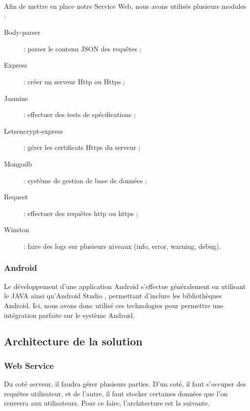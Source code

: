             Afin de mettre en place notre Service Web, nous avons utilisés plusieurs modules :
            \begin{description}
                \item [Body-parser] : parser le contenu JSON des requêtes ;
                \item [Express] : créer un serveur Http ou Https ;
                \item [Jasmine] : effectuer des tests de spécifications ;
                \item [Letsencrypt-express] : gérer les certificats Https du serveur ;
                \item [Mongodb] : système de gestion de base de données ;
                \item [Request] : effectuer des requêtes http ou https ;
                \item [Winston] : faire des logs sur plusieurs niveaux (info, error, warning, debug).
            \end{description}

        \subsubsection{Android}

            Le développement d'une application Android s'effectue généralement en utilisant le JAVA ainsi qu'Android Studio \cite{androidstudio}, permettant d'inclure les bibliothèques Android.
            Ici, nous avons donc utilisé ces technologies pour permettre une intégration parfaite sur le système Android.

    \subsection{Architecture de la solution}

        \subsubsection{Web Service}

            Du coté serveur, il faudra gérer plusieurs parties. D'un coté, il faut s'occuper des requêtes utilisateur, et de l'autre, il faut stocker certaines données que l'on renverra aux utilisateurs.
            Pour ce faire, l'architecture est la suivante.

